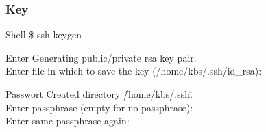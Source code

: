 \documentclass{beamer}
\begin{document}
    \begin{frame}
        \frametitle{Key}
        \begin{block}{Shell}
            \$ ssh-keygen
        \end{block}
        \pause
        \begin{block}{Enter}
            Generating public/private rsa key pair. \\
            Enter file in which to save the key (/home/kbs/.ssh/id\_rsa):
        \end{block}
        \pause
        \begin{block}{Passwort}
            Created directory \'/home/kbs/.ssh\'. \\
            Enter passphrase (empty for no passphrase):\\
            Enter same passphrase again: \\
        \end{block}
    \end{frame}
\end{document}
